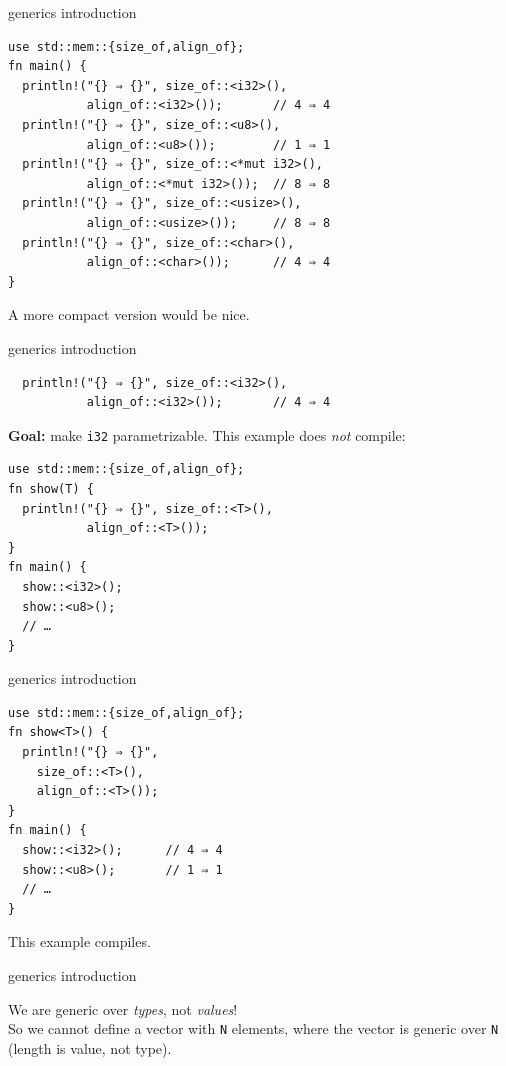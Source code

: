 \documentclass{beamer}
\begin{document}
\begin{frame}[fragile]{generics introduction}
  \begin{verbatim}
use std::mem::{size_of,align_of};
fn main() {
  println!("{} ⇒ {}", size_of::<i32>(),
           align_of::<i32>());       // 4 ⇒ 4
  println!("{} ⇒ {}", size_of::<u8>(),
           align_of::<u8>());        // 1 ⇒ 1
  println!("{} ⇒ {}", size_of::<*mut i32>(),
           align_of::<*mut i32>());  // 8 ⇒ 8
  println!("{} ⇒ {}", size_of::<usize>(),
           align_of::<usize>());     // 8 ⇒ 8
  println!("{} ⇒ {}", size_of::<char>(),
           align_of::<char>());      // 4 ⇒ 4
}
  \end{verbatim}

  A more compact version would be nice.
\end{frame}

\begin{frame}[fragile]{generics introduction}
  \begin{verbatim}
  println!("{} ⇒ {}", size_of::<i32>(),
           align_of::<i32>());       // 4 ⇒ 4
  \end{verbatim}

  \textbf{Goal:} make \texttt{i32} parametrizable. This example does \emph{not} compile:

  \begin{verbatim}
use std::mem::{size_of,align_of};
fn show(T) {
  println!("{} ⇒ {}", size_of::<T>(),
           align_of::<T>());
}
fn main() {
  show::<i32>();
  show::<u8>();
  // …
}
  \end{verbatim}
\end{frame}

\begin{frame}[fragile]{generics introduction}
  \begin{verbatim}
use std::mem::{size_of,align_of};
fn show<T>() {
  println!("{} ⇒ {}",
    size_of::<T>(),
    align_of::<T>());
}
fn main() {
  show::<i32>();      // 4 ⇒ 4
  show::<u8>();       // 1 ⇒ 1
  // …
}
  \end{verbatim}

  This example compiles.
\end{frame}


\begin{frame}[fragile]{generics introduction}
  
  {\Large We are generic over \emph{types}, not \emph{values}!} \\[5pt]

  So we cannot define a vector with \texttt{N} elements, where the vector is generic over \texttt{N} (length is value, not type).
\end{frame}
\end{document}
